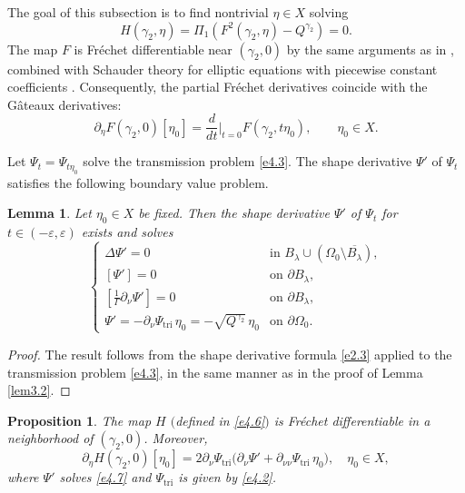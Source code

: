 \documentclass[reqno]{amsart}
\numberwithin{equation}{section}
\newtheorem{proposition}[theorem]{Proposition}
\newtheorem{lemma}[theorem]{Lemma}
\numberwithin{equation}{section}
\numberwithin{equation}{section}
\begin{document}
The goal of this subsection is to find nontrivial \(\eta \in X\) solving
\begin{equation}
H(\gamma_2, \eta) = \Pi_1\left( F^2(\gamma_2, \eta) - Q^{\gamma_2}\right)= 0. \nonumber
\end{equation}
The map \(F\) is Fr\'{e}chet differentiable near \((\gamma_2, 0)\) by the same arguments as in \cite[Theorem 5.3.2]{HenrotP}, combined with Schauder theory for elliptic equations with piecewise constant coefficients \cite{Lady}. Consequently, the partial Fr\'{e}chet derivatives coincide with the Gâteaux derivatives:
\[
\partial_\eta F(\gamma_2,0)[\eta_0] = \frac{d}{dt}\Big|_{t=0} F(\gamma_2, t\eta_0), \qquad \eta_0 \in X.
\]

Let \(\Psi_t = \Psi_{t\eta_0}\) solve the transmission problem \eqref{e4.3}. The shape derivative \(\Psi'\) of \(\Psi_t\) satisfies the following boundary value problem.

\begin{lemma}
Let \(\eta_0 \in X\) be fixed. Then the shape derivative \(\Psi'\) of \(\Psi_t\) for $t\in(-\varepsilon,\varepsilon)$ exists and solves
\begin{equation}\label{e4.7}
\begin{cases}
\Delta \Psi' = 0 & \text{in } B_\lambda \cup (\Omega_0 \setminus \overline{B_\lambda}), \\
\left[ \Psi' \right] = 0 & \text{on } \partial B_\lambda, \\
\left[ \tfrac{1}{\Gamma} \partial_\nu \Psi' \right] = 0 & \text{on } \partial B_\lambda, \\
\Psi' = -\partial_\nu \Psi_\mathrm{tri} \, \eta_0 = -\sqrt{Q^{\gamma_2}} \, \eta_0 & \text{on } \partial \Omega_0.
\end{cases}
\end{equation}
\end{lemma}

\begin{proof}
The result follows from the shape derivative formula \eqref{e2.3} applied to the transmission problem \eqref{e4.3}, in the same manner as in the proof of Lemma \ref{lem3.2}.
\end{proof}

\begin{proposition}\label{pro-4.3}
The map \(H\) $($defined in \eqref{e4.6}$)$ is Fr\'{e}chet differentiable in a neighborhood of \((\gamma_2, 0)\). Moreover,
\begin{equation}\label{e4.8}
\partial_\eta H(\gamma_2,0)[\eta_0] = 2 \partial_\nu \Psi_\mathrm{tri} \bigl( \partial_\nu \Psi' + \partial_{\nu\nu} \Psi_\mathrm{tri} \, \eta_0 \bigr), \quad \eta_0 \in X,
\end{equation}
where \(\Psi'\) solves \eqref{e4.7} and \(\Psi_\mathrm{tri}\) is given by \eqref{e4.2}.
\end{proposition}
\end{document}

